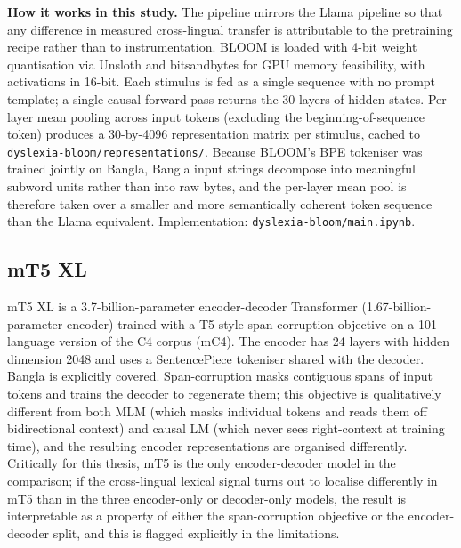 \textbf{How it works in this study.} The pipeline mirrors the Llama pipeline so that any difference in measured cross-lingual transfer is attributable to the pretraining recipe rather than to instrumentation. BLOOM is loaded with 4-bit weight quantisation via Unsloth and bitsandbytes for GPU memory feasibility, with activations in 16-bit. Each stimulus is fed as a single sequence with no prompt template; a single causal forward pass returns the 30 layers of hidden states. Per-layer mean pooling across input tokens (excluding the beginning-of-sequence token) produces a 30-by-4096 representation matrix per stimulus, cached to \texttt{dyslexia-bloom/representations/}. Because BLOOM's BPE tokeniser was trained jointly on Bangla, Bangla input strings decompose into meaningful subword units rather than into raw bytes, and the per-layer mean pool is therefore taken over a smaller and more semantically coherent token sequence than the Llama equivalent. Implementation: \texttt{dyslexia-bloom/main.ipynb}.

\subsection{mT5 XL}

mT5 XL \cite{xue2021mt5} is a 3.7-billion-parameter encoder-decoder Transformer (1.67-billion-parameter encoder) trained with a T5-style span-corruption objective on a 101-language version of the C4 corpus (mC4). The encoder has 24 layers with hidden dimension 2048 and uses a SentencePiece tokeniser shared with the decoder. Bangla is explicitly covered. Span-corruption masks contiguous spans of input tokens and trains the decoder to regenerate them; this objective is qualitatively different from both MLM (which masks individual tokens and reads them off bidirectional context) and causal LM (which never sees right-context at training time), and the resulting encoder representations are organised differently. Critically for this thesis, mT5 is the only encoder-decoder model in the comparison; if the cross-lingual lexical signal turns out to localise differently in mT5 than in the three encoder-only or decoder-only models, the result is interpretable as a property of either the span-corruption objective or the encoder-decoder split, and this is flagged explicitly in the limitations.

